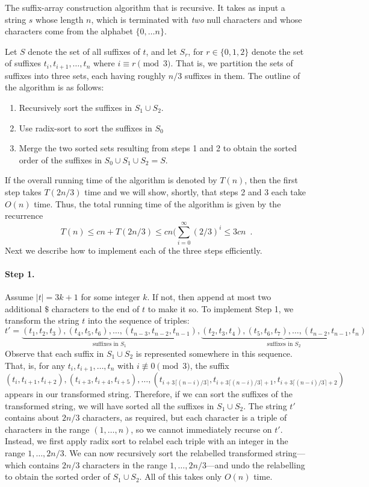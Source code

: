 The suffix-array construction algorithm that is recursive.  It takes as
input a string $s$ whose length $n$, which is terminated with \emph{two}
null characters and whose characters come from the alphabet $\{0,\ldots n\}$.

Let $S$ denote the set of all suffixes of $t$, and let $S_r$, for $r\in\{0,1,2\}$ denote the set of suffixes $t_i,t_{i+1},\ldots,t_n$ where $i\equiv r\pmod 3$.  That is, we partition the sets of suffixes into three sets, each having roughly $n/3$ suffixes in them.  The outline of the algorithm is as follows:

\begin{enumerate}
  \item Recursively sort the suffixes in $S_1\cup S_2$.
  \item Use radix-sort to sort the suffixes in $S_0$
  \item Merge the two sorted sets resulting from steps 1 and 2 to obtain
     the sorted order of the suffixes in $S_0\cup S_1\cup S_2=S$.
\end{enumerate}
If the overall running time of the algorithm is denoted by $T(n)$, then the first step takes $T(2n/3)$ time and we will show, shortly, that steps 2 and 3 each take $O(n)$ time.  Thus, the total running time of the algorithm is given by the recurrence
\[
    T(n) \le cn + T(2n/3) \le cn(\sum_{i=0}^\infty (2/3)^i \le 3cn \enspace .
\]
Next we describe how to implement each of the three steps efficiently.

\paragraph{Step 1.}
Assume $|t|=3k+1$ for some integer $k$. If not, then append at most two additional $\$$ characters to the end of $t$ to make it so.
To implement Step 1, we transform the string $t$ into the sequence of triples:
\[
   t'= \underbrace{(t_1,t_2,t_3),(t_4,t_5,t_6),\ldots,(t_{n-3},t_{n-2},t_{n-1})}_\text{suffixes in $S_1$},
   \underbrace{(t_2,t_3,t_4),(t_5,t_6,t_7),\ldots,(t_{n-2},t_{n-1},t_{n})}_\text{suffixes in $S_2$}
\]
Observe that each suffix in $S_1\cup S_2$ is represented somewhere in this sequence.  That, is, for any $t_i,t_{i+1},\ldots,t_n$ with $i\not\equiv 0\pmod 3$, the suffix 
\[
   (t_i,t_{i+1},t_{i+2}),(t_{i+3},t_{i+4},t_{i+5}),\ldots,
       (t_{i+3\lceil(n-i)/3\rceil},t_{i+3\lceil(n-i)/3\rceil+1},
       t_{i+3\lceil(n-i)/3\rceil+2})
\]
appears in our transformed string. Therefore, if we can sort the suffixes
of the transformed string, we will have sorted all the suffixes in
$S_1\cup S_2$.  The string $t'$ contains about $2n/3$ characters, as
required, but each character is a triple of characters in the range
$(1,\ldots,n)$, so we cannot immediately recurse on $t'$.  Instead,
we first apply radix sort to relabel each triple with an integer in
the range $1,\ldots,2n/3$.  We can now recursively sort the relabelled
transformed string---which contains $2n/3$ characters in the range
$1,\ldots,2n/3$---and undo the relabelling to obtain the sorted order
of $S_1\cup S_2$.  All of this takes only $O(n)$ time.

